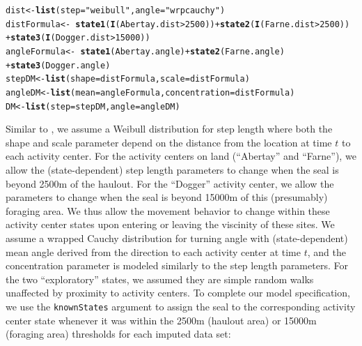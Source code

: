 \documentclass[12pt]{article}\usepackage[]{graphicx}\usepackage[]{color}
\makeatletter
\newcommand{\hlnum}[1]{\textcolor[rgb]{0.686,0.059,0.569}{#1}}%
\newcommand{\hlstr}[1]{\textcolor[rgb]{0.192,0.494,0.8}{#1}}%
\newcommand{\hlopt}[1]{\textcolor[rgb]{0,0,0}{#1}}%
\newcommand{\hlstd}[1]{\textcolor[rgb]{0.345,0.345,0.345}{#1}}%
\newcommand{\hlkwb}[1]{\textcolor[rgb]{0.69,0.353,0.396}{#1}}%
\newcommand{\hlkwc}[1]{\textcolor[rgb]{0.333,0.667,0.333}{#1}}%
\newcommand{\hlkwd}[1]{\textcolor[rgb]{0.737,0.353,0.396}{\textbf{#1}}}%
\newenvironment{kframe}{%
 \def\at@end@of@kframe{}%
 \ifinner\ifhmode%
  \def\at@end@of@kframe{\end{minipage}}%
  \begin{minipage}{\columnwidth}%
 \fi\fi%
 \def\FrameCommand##1{\hskip\@totalleftmargin \hskip-\fboxsep
 \colorbox{shadecolor}{##1}\hskip-\fboxsep
     \hskip-\linewidth \hskip-\@totalleftmargin \hskip\columnwidth}%
 \MakeFramed {\advance\hsize-\width
   \@totalleftmargin\z@ \linewidth\hsize
   \@setminipage}}%
 {\par\unskip\endMakeFramed%
 \at@end@of@kframe}
\newenvironment{knitrout}{}{} %
\makeatother
\begin{document}
\begin{knitrout}
\color{fgcolor}\begin{kframe}
\begin{alltt}
\hlstd{dist} \hlkwb{<-} \hlkwd{list}\hlstd{(}\hlkwc{step} \hlstd{=} \hlstr{"weibull"}\hlstd{,} \hlkwc{angle} \hlstd{=} \hlstr{"wrpcauchy"}\hlstd{)}
\hlstd{distFormula} \hlkwb{<-} \hlopt{~}\hlkwd{state1}\hlstd{(}\hlkwd{I}\hlstd{(Abertay.dist}\hlopt{>}\hlnum{2500}\hlstd{))} \hlopt{+} \hlkwd{state2}\hlstd{(}\hlkwd{I}\hlstd{(Farne.dist}\hlopt{>}\hlnum{2500}\hlstd{))}
                  \hlopt{+} \hlkwd{state3}\hlstd{(}\hlkwd{I}\hlstd{(Dogger.dist}\hlopt{>}\hlnum{15000}\hlstd{))}
\hlstd{angleFormula} \hlkwb{<-} \hlopt{~}\hlkwd{state1}\hlstd{(Abertay.angle)} \hlopt{+} \hlkwd{state2}\hlstd{(Farne.angle)}
                  \hlopt{+} \hlkwd{state3}\hlstd{(Dogger.angle)}
\hlstd{stepDM} \hlkwb{<-} \hlkwd{list}\hlstd{(}\hlkwc{shape} \hlstd{= distFormula,} \hlkwc{scale} \hlstd{= distFormula)}
\hlstd{angleDM} \hlkwb{<-} \hlkwd{list}\hlstd{(}\hlkwc{mean} \hlstd{= angleFormula,} \hlkwc{concentration} \hlstd{= distFormula)}
\hlstd{DM} \hlkwb{<-} \hlkwd{list}\hlstd{(}\hlkwc{step} \hlstd{= stepDM,} \hlkwc{angle} \hlstd{= angleDM)}
\end{alltt}
\end{kframe}
\end{knitrout}
Similar to \cite{McClintockEtAl2012}, we assume a Weibull distribution for step length where both the shape and scale parameter depend on the distance from the location at time $t$ to each activity center. For the activity centers on land (``Abertay'' and ``Farne''), we allow the (state-dependent) step length parameters to change when the seal is beyond 2500m of the haulout. For the ``Dogger'' activity center, we allow the parameters to change when the seal is beyond 15000m of this (presumably) foraging area. We thus allow the movement behavior to change within these activity center states upon entering or leaving the viscinity of these sites.  We assume a wrapped Cauchy distribution for turning angle with (state-dependent) mean angle derived from the direction to each activity center at time $t$, and the concentration parameter is modeled similarly to the step length parameters. For the two ``exploratory'' states, we assumed they are simple random walks unaffected by proximity to activity centers. To complete our model specification, we use the \verb|knownStates| argument to assign the seal to the corresponding activity center state whenever it was within the 2500m (haulout area) or 15000m (foraging area) thresholds for each imputed data set:
\end{document}
